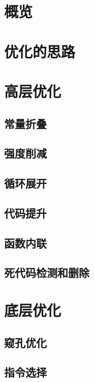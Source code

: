 \documentclass[cn,11pt,chinese]{elegantbook}
\begin{document}
\section{概览}

\section{优化的思路}

\section{高层优化}

\subsection{常量折叠}

\subsection{强度削减}

\subsection{循环展开}

\subsection{代码提升}

\subsection{函数内联}

\subsection{死代码检测和删除}

\section{底层优化}

\subsection{窥孔优化}

\subsection{指令选择}
\end{document}
